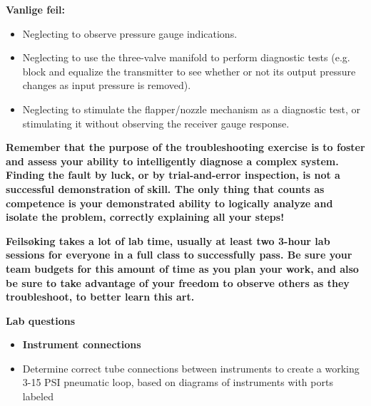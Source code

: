 {{\vskip 10pt

{\bf Vanlige feil:}

\begin{itemize}
\item{} Neglecting to observe pressure gauge indications.
\item{} Neglecting to use the three-valve manifold to perform diagnostic tests (e.g. block and equalize the transmitter to see whether or not its output pressure changes as input pressure is removed).
\item{} Neglecting to stimulate the flapper/nozzle mechanism as a diagnostic test, or stimulating it without observing the receiver gauge response.
\end{itemize}

\vskip 10pt

{\bf Remember that the purpose of the troubleshooting exercise is to foster and assess your ability to intelligently diagnose a complex system.  Finding the fault by luck, or by trial-and-error inspection, is not a successful demonstration of skill.  The only thing that counts as competence is your demonstrated ability to logically analyze and isolate the problem, correctly explaining all your steps!}

\vskip 10pt

{\bf Feilsøking takes a lot of lab time, usually at least two 3-hour lab sessions for everyone in a full class to successfully pass.  Be sure your team budgets for this amount of time as you plan your work, and also be sure to take advantage of your freedom to observe others as they troubleshoot, to better learn this art.}



\vfil \eject

\noindent
{\bf Lab questions}

\vskip 5pt

\begin{itemize}
\item{} {\bf Instrument connections}
\item{} Determine correct tube connections between instruments to create a working 3-15 PSI pneumatic loop, based on diagrams of instruments with ports labeled
\end{itemize}

\filbreak

}}
